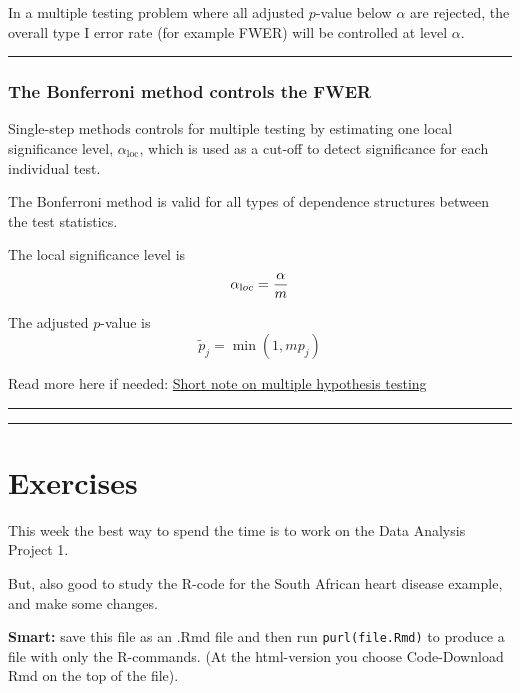 \documentclass[
  letterpaper,
  DIV=11,
  numbers=noendperiod]{scrartcl}
\begin{document}
In a multiple testing problem where all adjusted \(p\)-value below
\(\alpha\) are rejected, the overall type I error rate (for example
FWER) will be controlled at level \(\alpha\).

\begin{center}\rule{0.5\linewidth}{0.5pt}\end{center}

\hypertarget{the-bonferroni-method-controls-the-fwer}{%
\subsubsection{The Bonferroni method controls the
FWER}\label{the-bonferroni-method-controls-the-fwer}}

Single-step methods controls for multiple testing by estimating one
local significance level, \(\alpha_{\text{loc}}\), which is used as a
cut-off to detect significance for each individual test.

The Bonferroni method is valid for all types of dependence structures
between the test statistics.

The local significance level is \[\alpha_{\text loc}=\frac{\alpha}{m}\]

The adjusted \(p\)-value is \[ \tilde{p}_j =\min(1,m p_j)\]

Read more here if needed:
\href{https://www.math.ntnu.no/emner/TMA4267/2017v/multtest.pdf}{Short
note on multiple hypothesis testing}

\begin{center}\rule{0.5\linewidth}{0.5pt}\end{center}

\begin{center}\rule{0.5\linewidth}{0.5pt}\end{center}

\hypertarget{exercises}{%
\section{Exercises}\label{exercises}}

This week the best way to spend the time is to work on the Data Analysis
Project 1.

But, also good to study the R-code for the South African heart disease
example, and make some changes.

\textbf{Smart:} save this file as an .Rmd file and then run
\texttt{purl(file.Rmd)} to produce a file with only the R-commands. (At
the html-version you choose Code-Download Rmd on the top of the file).
\end{document}
